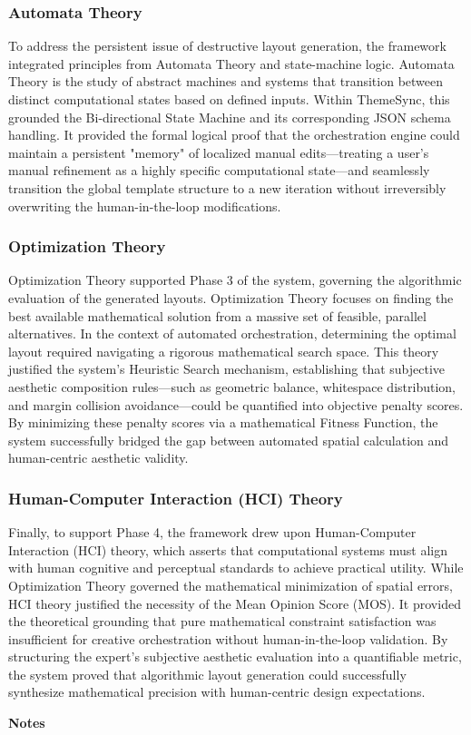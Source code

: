 \begin{refsection}
\subsubsection{Automata Theory}
To address the persistent issue of destructive layout generation, the framework integrated principles from Automata Theory and state-machine logic. Automata Theory is the study of abstract machines and systems that transition between distinct computational states based on defined inputs. Within ThemeSync, this grounded the Bi-directional State Machine and its corresponding JSON schema handling. It provided the formal logical proof that the orchestration engine could maintain a persistent "memory" of localized manual edits—treating a user’s manual refinement as a highly specific computational state—and seamlessly transition the global template structure to a new iteration without irreversibly overwriting the human-in-the-loop modifications.

\subsubsection{Optimization Theory}
Optimization Theory supported Phase 3 of the system, governing the algorithmic evaluation of the generated layouts. Optimization Theory focuses on finding the best available mathematical solution from a massive set of feasible, parallel alternatives. In the context of automated orchestration, determining the optimal layout required navigating a rigorous mathematical search space. This theory justified the system's Heuristic Search mechanism, establishing that subjective aesthetic composition rules—such as geometric balance, whitespace distribution, and margin collision avoidance—could be quantified into objective penalty scores. By minimizing these penalty scores via a mathematical Fitness Function, the system successfully bridged the gap between automated spatial calculation and human-centric aesthetic validity.

\subsubsection{Human-Computer Interaction (HCI) Theory}
Finally, to support Phase 4, the framework drew upon Human-Computer Interaction (HCI) theory, which asserts that computational systems must align with human cognitive and perceptual standards to achieve practical utility. While Optimization Theory governed the mathematical minimization of spatial errors, HCI theory justified the necessity of the Mean Opinion Score (MOS). It provided the theoretical grounding that pure mathematical constraint satisfaction was insufficient for creative orchestration without human-in-the-loop validation. By structuring the expert’s subjective aesthetic evaluation into a quantifiable metric, the system proved that algorithmic layout generation could successfully synthesize mathematical precision with human-centric design expectations.



\clearpage

\begin{center}
\textbf{Notes}
\end{center}
\printbibliography[heading=none]
\end{refsection}